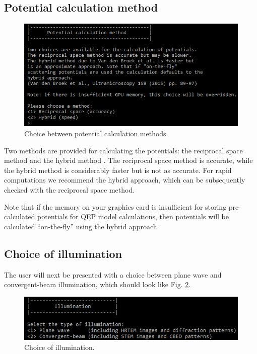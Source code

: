 \documentclass[12pt,a4paper]{article}
\begin{document}
\subsection{Potential calculation method}
\label{sec:pot_calc}

\begin{figure}[!h]
\begin{center}
    \includegraphics[scale=0.75]{potential_method.png}
\caption{Choice between potential calculation methods.}
\label{fig:potential_method}
\end{center}
\end{figure}

Two methods are provided for calculating the potentials: the reciprocal space method and the hybrid method \cite{VDB}.
The reciprocal space method is accurate, while the hybrid method is considerably faster but is not as accurate.
For rapid computations we recommend the hybrid approach, which can be subsequently checked with the reciprocal space method.

Note that if the memory on your graphics card is insufficient for storing pre-calculated potentials for QEP model calculations, then potentials will be calculated ``on-the-fly'' using the hybrid approach.




\subsection{Choice of illumination}

The user will next be presented with a choice between plane wave and convergent-beam illumination, which should look like Fig. \ref{fig:illum_choice}.

\begin{figure}[!h]
\begin{center}
    \includegraphics[scale=0.75]{illumination_choice.png}
\caption{Choice of illumination.}
\label{fig:illum_choice}
\end{center}
\end{figure}
\end{document}
